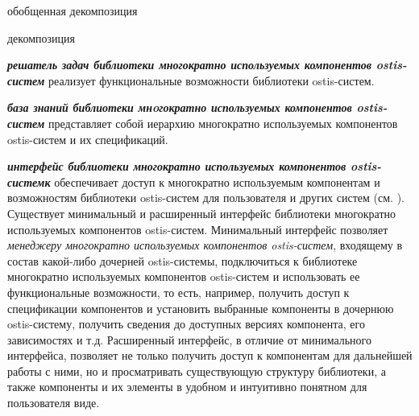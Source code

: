 \begin{SCn}
	\begin{scnrelfromset}{обобщенная декомпозиция}
		\begin{scnindent}
			\begin{scnrelfromset}{декомпозиция}
				\begin{scnindent}
				\end{scnindent}
			\end{scnrelfromset}
		\end{scnindent}
	\end{scnrelfromset}
\end{SCn}

\textit{\textbf{решатель задач библиотеки многократно используемых компонентов ostis-систем}} реализует функциональные возможности библиотеки ostis-систем.

\textit{\textbf{база знаний библиотеки мнoгократно используемых компонентов ostis-систем}} представляет собой иерархию многократно используемых компонентов ostis-систем и их спецификаций.

\textit{\textbf{интерфейс библиотеки многократно используемых компонентов ostis-системк}} обеспечивает доступ к многократно используемым компонентам и возможностям библиотеки ostis-систем для пользователя и других систем (см. ). Существует минимальный и расширенный интерфейс библиотеки многократно используемых компонентов ostis-систем. Минимальный интерфейс позволяет \textit{менеджеру многократно используемых компонентов ostis-систем}, входящему в состав какой-либо дочерней ostis-системы, подключиться к библиотеке многократно используемых компонентов ostis-систем и использовать ее функциональные возможности, то есть, например, получить доступ к спецификации компонентов и установить выбранные компоненты в дочернюю ostis-систему, получить сведения до доступных версиях компонента, его зависимостях и т.д. Расширенный интерфейс, в отличие от минимального интерфейса, позволяет не только получить доступ к компонентам для дальнейшей работы с ними, но и просматривать существующую структуру библиотеки, а также компоненты и их элементы в удобном и интуитивно понятном для пользователя виде.

